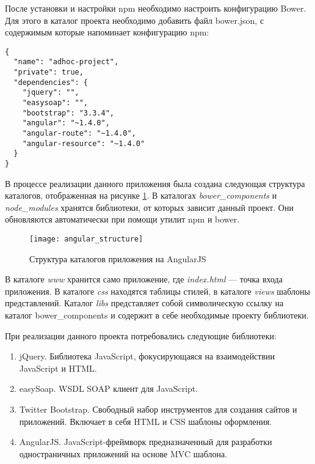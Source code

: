 После установки и настройки npm необходимо настроить конфигурацию Bower. Для этого в каталог проекта необходимо добавить файл bower.json, с содержимым которые напоминает конфигурацию npm:
\begin{lstlisting}[basicstyle=\normalsize]
{
  "name": "adhoc-project",
  "private": true,
  "dependencies": {
    "jquery": "",
    "easysoap": "",
    "bootstrap": "3.3.4",
    "angular": "~1.4.0",
    "angular-route": "~1.4.0",
    "angular-resource": "~1.4.0"
  }
}
\end{lstlisting}

% 
В процессе реализации данного приложения была создана следующая структура каталогов, отображенная на рисунке \ref{angular_structure}. В каталогах \textit{bower\_components} и \textit{node\_modules} хранятся библиотеки, от которых зависит данный проект. Они обновляются автоматически при помощи утилит npm и bower.
\begin{figure}[h]
\center\texttt{[image: angular\_structure]}
\caption{Структура каталогов приложения на AngularJS}\label{angular_structure}
\end{figure}

В каталоге \textit{www} хранится само приложение, где \textit{index.html} --- точка входа приложения. В каталоге \textit{css} находятся таблицы стилей, в каталоге \textit{views} шаблоны представлений. Каталог \textit{libs} представляет собой символическую ссылку на каталог bower\_components и содержит в себе необходимые проекту библиотеки.

При реализации данного проекта потребовались следующие библиотеки:
\begin{enumerate}
 \item jQuery. Библиотека JavaScript, фокусирующаяся на взаимодействии JavaScript и HTML\cite{jquery}.
 \item easySoap. WSDL SOAP клиент для JavaScript.
 \item Twitter Bootstrap. Свободный набор инструментов для создания сайтов и приложений. Включает в себя HTML и CSS шаблоны оформления\cite{bootstrap}.
 \item AngularJS. JavaScript-фреймворк предназначенный для разработки одностраничных приложений на основе MVC шаблона\cite{angular}.
\end{enumerate}

